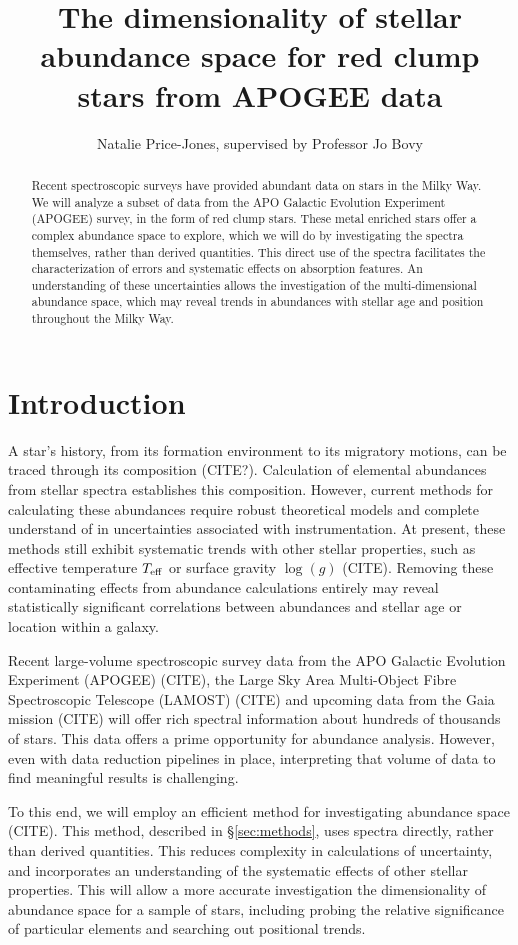 \documentclass[preprint]{aastex}
\begin{document}
\title{The dimensionality of stellar abundance space for red clump stars from APOGEE data}
\author{Natalie Price-Jones, supervised by Professor Jo Bovy}

\begin{abstract}
Recent spectroscopic surveys have provided abundant data on stars in the Milky Way. We will analyze a subset of data from the APO Galactic Evolution Experiment (APOGEE) survey, in the form of red clump stars. These metal enriched stars offer a complex abundance space to explore, which we will do by investigating the spectra themselves, rather than derived quantities. This direct use of the spectra facilitates the characterization of errors and systematic effects on absorption features. An understanding of these uncertainties allows the investigation of the multi-dimensional abundance space, which may reveal trends in abundances with stellar age and position throughout the Milky Way.

\end{abstract}

\section{Introduction}
\label{sec:back}
A star's history, from its formation environment to its migratory motions, can be traced through its composition (CITE?). Calculation of elemental abundances from stellar spectra establishes this composition. However, current methods for calculating these abundances require robust theoretical models and complete understand of in uncertainties associated with instrumentation. At present, these methods still exhibit systematic trends with other stellar properties, such as effective temperature $T_{\rm eff}$ or surface gravity $\log(g)$ (CITE). Removing these contaminating effects from abundance calculations entirely may reveal statistically significant correlations between abundances and stellar age or location within a galaxy. 

Recent large-volume spectroscopic survey data from the APO Galactic Evolution Experiment (APOGEE) (CITE), the Large Sky Area Multi-Object Fibre Spectroscopic Telescope (LAMOST) (CITE) and upcoming data from the Gaia mission (CITE) will offer rich spectral information about hundreds of thousands of stars. This data offers a prime opportunity for abundance analysis. However, even with data reduction pipelines in place, interpreting that volume of data to find meaningful results is challenging. 

To this end, we will employ an efficient method for investigating abundance space (CITE). This method, described in \S\ref{sec:methods}, uses spectra directly, rather than derived quantities. This reduces complexity in calculations of uncertainty, and incorporates an understanding of the systematic effects of other stellar properties. This will allow a more accurate investigation the dimensionality of abundance space for a sample of stars, including probing the relative significance of particular elements and searching out positional trends.
\end{document}

